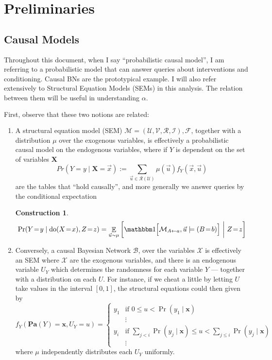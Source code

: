\documentclass{article}
\newcommand{\E}{\mathop{\mathbb E}}
\newcommand\Pa{\mathbf{Pa}}
\theoremstyle{plain}
\newtheorem{constr}[theorem]{Construction}
\theoremstyle{definition}
\theoremstyle{remark}
\newcommand{\cdo}{\mathop{\mathrm{do}}}
\begin{document}
\section{Preliminaries}
\subsection{Causal Models}

Throughout this document, when I say ``probabilistic causal model'', I am referring to a probabilistic model that can answer queries about interventions and conditioning. Causal BNs are the prototypical example. I will also refer extensively to Structural Equation Models (SEMs) in this analysis. The relation between them will be useful in understanding $\alpha$.

First, observe that these two notions are related:

\begin{enumerate}
\item A structural equation model (SEM) $\mathcal M = (\mathcal U, \mathcal V, \mathcal R, \mathcal I), \mathcal F$, together with a distribution $\mu$ over the exogenous variables, is effectively a probabilistic causal model on the endogenous variables, where if $Y$ is dependent on the set of variables $\mathbf X$
\[ Pr(Y = y \mid \mathbf X = \vec x) := \sum_{\vec u \in \mathcal R(\mathcal U)} \mu(\vec u) f_Y(\vec x, \vec u) \]
are the tables that ``hold causally'', and more generally we answer queries by the conditional expectation
\begin{constr}
	\[ \Pr(Y\!=\!y \mid \cdo(X\!=\!x), Z\!=\!z) = \E_{\vec u \sim \mu}\bigg[ \mathbbm1\Big[ \mathcal M_{A \gets a}, \vec u\models (B\!=\!b) \Big]~\bigg|~Z\!=\!z\bigg] \]
\end{constr}

\item Conversely, a causal Bayesian Network $\mathcal B$, over the variables $\mathcal X$ is effectively an SEM where $\mathcal X$ are the exogenous variables, and there is an endogenous variable $U_Y$ which determines the randomness for each variable $Y$ --- together with a distribution on each $U$. For instance, if we cheat a little by letting $U$ take values in the interval $[0,1]$, the structural equations could then given by 
\[ f_Y(\Pa(Y) = \mathbf x, U_Y = u) = \begin{cases}
	y_1 & \text{if }0 \leq u < \Pr(y_1\mid \mathbf x) \\
	&\vdots \\
	y_i & \text{if }\sum_{j < i} \Pr(y_j\mid \mathbf x) \leq u < \sum_{j \leq i} \Pr (y_j\mid \mathbf x)\\
	&\vdots
\end{cases} 
\]
where $\mu$ independently distributes each $U_Y$ uniformly.
\end{enumerate}
\end{document}
